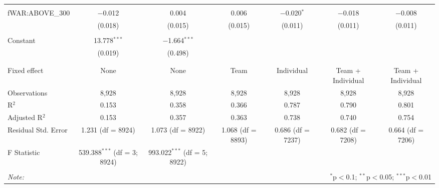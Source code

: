 \begin{table}[!htbp]
\begin{tabular}{@{\extracolsep{5pt}}lcccccc}
  & & & & & & \\
 fWAR:ABOVE\_300 & $-$0.012 & 0.004 & 0.006 & $-$0.020$^{*}$ & $-$0.018 & $-$0.008 \\
  & (0.018) & (0.015) & (0.015) & (0.011) & (0.011) & (0.011) \\
  & & & & & & \\
 Constant & 13.778$^{***}$ & $-$1.664$^{***}$ &  &  &  &  \\
  & (0.019) & (0.498) &  &  &  &  \\
  & & & & & & \\
\hline \\[-1.8ex]
Fixed effect & None & None & Team & Individual & Team + Individual & Team + Individual \\
Observations & 8,928 & 8,928 & 8,928 & 8,928 & 8,928 & 8,928 \\
R$^{2}$ & 0.153 & 0.358 & 0.366 & 0.787 & 0.790 & 0.801 \\
Adjusted R$^{2}$ & 0.153 & 0.357 & 0.363 & 0.738 & 0.740 & 0.754 \\
Residual Std. Error & 1.231 (df = 8924) & 1.073 (df = 8922) & 1.068 (df = 8893) & 0.686 (df = 7237) & 0.682 (df = 7208) & 0.664 (df = 7206) \\
F Statistic & 539.388$^{***}$ (df = 3; 8924) & 993.022$^{***}$ (df = 5; 8922) &  &  &  &  \\
\hline
\hline \\[-1.8ex]
\textit{Note:}  & \multicolumn{6}{r}{$^{*}$p$<$0.1; $^{**}$p$<$0.05; $^{***}$p$<$0.01} \\
\end{tabular}
\end{table}
